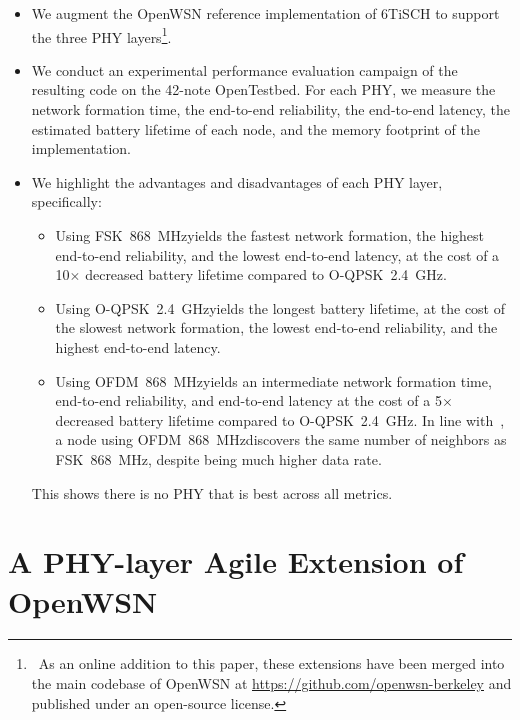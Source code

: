 \documentclass[sensors,article,submit,moreauthors,pdftex]{Definitions/mdpi}
\newcommand{\fsk}           {FSK~868~MHz}
\newcommand{\oqpsk}         {O-QPSK~2.4~GHz}
\newcommand{\ofdm}          {OFDM~868~MHz}
\begin{document}
\begin{itemize}
    \item We augment the OpenWSN reference implementation of 6TiSCH to support the three PHY layers\footnote{~As an online addition to this paper, these extensions have been merged into the main codebase of OpenWSN at \url{https://github.com/openwsn-berkeley} and published under an open-source license.}.
    \item We conduct an experimental performance evaluation campaign of the resulting code on the 42-note OpenTestbed.
        For each PHY, we measure 
            the network formation time,
            the end-to-end reliability,
            the end-to-end latency, 
            the estimated battery lifetime of each node, and
            the memory footprint of the implementation.
    \item We highlight the advantages and disadvantages of each PHY layer, specifically:
        \begin{itemize}
            \item Using \fsk yields
                the fastest network formation,
                the highest end-to-end reliability, and
                the lowest end-to-end latency,
                    at the cost of
                        a 10$\times$ decreased battery lifetime compared to \oqpsk.
            \item Using \oqpsk yields
                the longest battery lifetime,
                    at the cost of
                        the slowest network formation,
                        the lowest end-to-end reliability, and
                        the highest end-to-end latency.
            \item Using \ofdm yields
                an intermediate network formation time,
                end-to-end reliability, and
                end-to-end latency
                    at the cost of
                        a 5$\times$ decreased battery lifetime compared to \oqpsk.
                In line with~\cite{munoz18evaluation}, a node using \ofdm discovers the same number of neighbors as \fsk,
                    despite being much higher data rate. 
        \end{itemize}
        This shows there is no PHY that is best across all metrics.
\end{itemize}

\section{A PHY-layer Agile Extension of OpenWSN}
\label{sec:openwsn}
\end{document}
